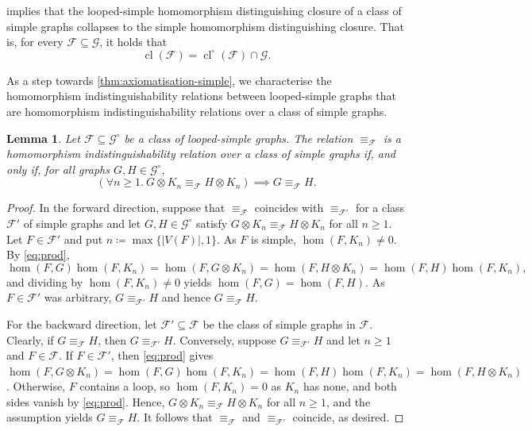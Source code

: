 \documentclass[11pt]{scrartcl}
\theoremstyle{definition}
\theoremstyle{plain}
\newtheorem{lemma}[definition]{Lemma}
\theoremstyle{remark}
\DeclareMathOperator{\cl}{cl}
\newcommand{\lG}{\mathcal{G}^\circ}
\newcommand{\G}{\mathcal{G}}
\begin{document}
implies that the looped-simple homomorphism distinguishing closure of a class of simple graphs collapses to the simple homomorphism distinguishing closure.
That is, for every $\mathcal{F} \subseteq \G$, it holds that
\begin{equation}\label{eq:drop-loops-closure}
    \cl(\mathcal{F}) = \cl^\circ(\mathcal{F}) \cap \G.
\end{equation}

As a step towards \cref{thm:axiomatisation-simple},
we characterise the homomorphism indistinguishability relations between looped-simple graphs that are homomorphism indistinguishability relations over a class of simple graphs.


\begin{lemma}\label{lem:loops-same-relation}
		Let $\mathcal{F} \subseteq \lG$ be a class of looped-simple graphs.
		The relation $\equiv_{\mathcal{F}}$ is a homomorphism indistinguishability relation over a class of simple graphs
		if, and only if, for all graphs $G, H \in \lG$,
		\[
			\left( \forall n \geq 1.\ G \otimes K_n \equiv_{\mathcal{F}} H\otimes K_n \right)
			\implies G \equiv_{\mathcal{F}} H.
		\]
 	\end{lemma}
	\begin{proof}
		In the forward direction,
		suppose that $\equiv_{\mathcal{F}}$ coincides with $\equiv_{\mathcal{F}'}$ for a class $\mathcal{F}'$ of simple graphs
		and let $G, H \in \lG$ satisfy $G \otimes K_n \equiv_{\mathcal{F}} H \otimes K_n$ for all $n \geq 1$.
		Let $F \in \mathcal{F}'$ and put $n \coloneqq \max\{|V(F)|, 1\}$.
		As $F$ is simple, $\hom(F, K_n) \neq 0$.
		By \eqref{eq:prod},
		\[
			\hom(F, G)\hom(F, K_n)
			= \hom(F, G \otimes K_n)
			= \hom(F, H \otimes K_n)
			= \hom(F, H)\hom(F, K_n),
		\]
		and dividing by $\hom(F, K_n) \neq 0$ yields $\hom(F, G) = \hom(F, H)$.
		As $F \in \mathcal{F}'$ was arbitrary, $G \equiv_{\mathcal{F}'} H$ and hence $G \equiv_{\mathcal{F}} H$.

		For the backward direction, let $\mathcal{F}' \subseteq \mathcal{F}$ be the class of simple graphs in $\mathcal{F}$.
		Clearly, if $G \equiv_{\mathcal{F}} H$, then $G \equiv_{\mathcal{F}'} H$.
		Conversely, suppose $G \equiv_{\mathcal{F}'} H$ and let $n \geq 1$ and $F \in \mathcal{F}$.
		If $F \in \mathcal{F}'$, then \eqref{eq:prod} gives
		$\hom(F, G \otimes K_n) = \hom(F, G)\hom(F, K_n) = \hom(F, H)\hom(F, K_n) = \hom(F, H \otimes K_n)$.
		Otherwise, $F$ contains a loop, so $\hom(F, K_n) = 0$ as $K_n$ has none,
		and both sides vanish by \eqref{eq:prod}.
		Hence, $G \otimes K_n \equiv_{\mathcal{F}} H \otimes K_n$ for all $n \geq 1$,
		and the assumption yields $G \equiv_{\mathcal{F}} H$.
		It follows that $\equiv_{\mathcal{F}}$ and $\equiv_{\mathcal{F}'}$ coincide, as desired.
	\end{proof}
\end{document}
